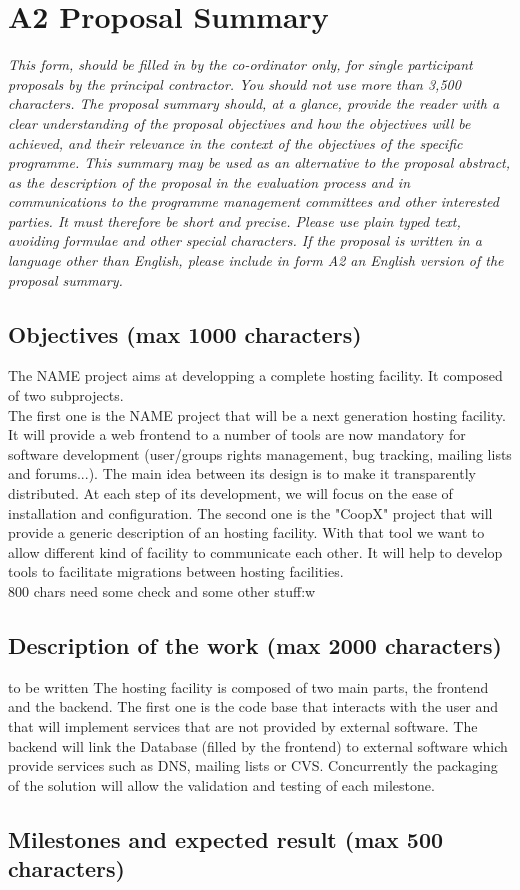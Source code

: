 \documentclass[a4paper,11pt]{report}
\begin{document}
\section*{A2 Proposal Summary}
\textit{This form, should be filled in by the co-ordinator only, for single
participant proposals by the principal contractor. You should not use more than
3,500 characters. The proposal summary should, at a glance, provide the reader
with a clear understanding of the proposal objectives and how the objectives
will be achieved, and their relevance in the context of the objectives of the
specific programme. This summary may be used as an alternative to the proposal
abstract, as the description of the proposal in the evaluation process and in
communications to the programme management committees and other interested
parties. It must therefore be short and precise. Please use plain typed text,
avoiding formulae and other special characters. If the proposal is written in a
language other than English, please include in form A2 an English version of
the proposal summary.} \\
\subsection*{Objectives (max 1000 characters)}
The NAME project aims at developping a complete hosting facility. It composed
of two subprojects. \\
The first one is the NAME project that will be a next generation hosting
facility. It will provide a web frontend to a number of tools are now mandatory
for software development (user/groups rights management, bug tracking, mailing
lists and forums...). The main idea between its design is to make it
transparently distributed. At each step of its development, we will focus on
the ease of installation and configuration.
The second one is the "CoopX" project that will provide a generic description of
an hosting facility. With that tool we want to allow different kind of facility
to communicate each other. It will help to develop tools to facilitate
migrations between hosting facilities.
\\ 800 chars need some check and some other stuff:w
\subsection*{Description of the work (max 2000 characters)} to be written
The hosting facility is composed of two main parts, the frontend and the
backend. The first one is the code base that interacts with the user and that
will implement services that are not provided by external software. The backend
will link the Database (filled by the frontend) to external software which
provide services such as DNS, mailing lists or CVS. Concurrently the packaging
of the solution will allow the validation and testing of each milestone.
\subsection*{Milestones and expected result (max 500 characters)}
\end{document}
